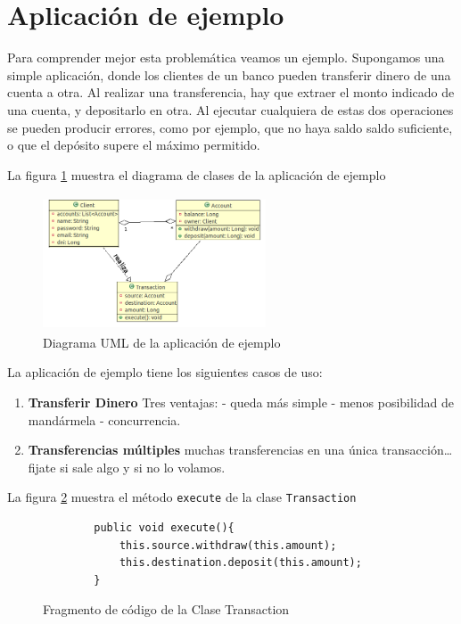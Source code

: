 \section{Aplicación de ejemplo}

Para comprender mejor esta problemática veamos un ejemplo. Supongamos una simple
aplicación, donde los clientes de un banco pueden transferir dinero de
una cuenta a otra. Al realizar una transferencia, hay que extraer el monto
indicado de una cuenta, y depositarlo en otra. 
Al ejecutar cualquiera de estas dos operaciones se pueden producir errores,
como por ejemplo, que no haya saldo saldo suficiente, o que el depósito supere
el máximo permitido.

La figura \ref{example} muestra el diagrama de clases de la aplicación de
ejemplo

	\medskip

	\begin{figure}[h]
		\centering
		\includegraphics[width=250px, height=150px]{img/transaccion}
		\caption{Diagrama UML de la aplicación de ejemplo}
		\label{example}
	\end{figure}	
	
La aplicación de ejemplo tiene los siguientes casos de uso:

\begin{enumerate}
  \item{\bf{Transferir Dinero}} 
	Tres ventajas:
	- queda más simple
	- menos posibilidad de mandármela
	- concurrencia.
  	
  \item{\bf{Transferencias múltiples}}
	muchas transferencias en una única transacción\ldots fijate si sale algo y si no
	lo volamos.
\end{enumerate}

La figura \ref{executeTransaction} muestra el método  \lstinline|execute| de la
clase \lstinline|Transaction| \begin{figure}[h]
	\begin{lstlisting}
		public void execute(){
			this.source.withdraw(this.amount);
			this.destination.deposit(this.amount);
		}
	\end{lstlisting}
	\caption{Fragmento de código de la Clase Transaction}
	\label{executeTransaction}
\end{figure}
